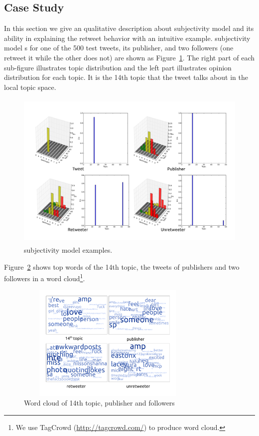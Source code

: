 \documentclass[smallcondensed]{svjour3}     %
\begin{document}
\subsection{Case Study}
\label{example}
In this section we give an qualitative description about subjectivity model  and its ability in explaining the retweet behavior with an intuitive example. 
subjectivity model s for one of the 500 test tweets, its publisher, and two followers (one retweet it while the other does not) are shown as Figure~\ref{fig:graph4}. 
The right part of each sub-figure illustrates topic distribution and the left part illustrates opinion distribution for each topic. 
It is the 14th topic that the tweet talks about in the local topic space.
\begin{figure}[htb]
\centering%
\includegraphics[width=5.0in,height=3.0in]{tweets10.pdf}
\caption{subjectivity model  examples.}
\label{fig:graph4}
\end{figure}
Figure~\ref{fig:graph5} shows top words of the 14th topic, the tweets of publishers and two followers in a word cloud\footnote{We use TagCrowd (\url{http://tagcrowd.com/}) to produce word cloud.}.
\begin{figure}[htb]
\centering
\includegraphics[width=3.5in,height=2.2in]{text_cloud.pdf}
\caption{Word cloud of 14th topic, publisher and followers}
\label{fig:graph5}
\end{figure}
\end{document}
